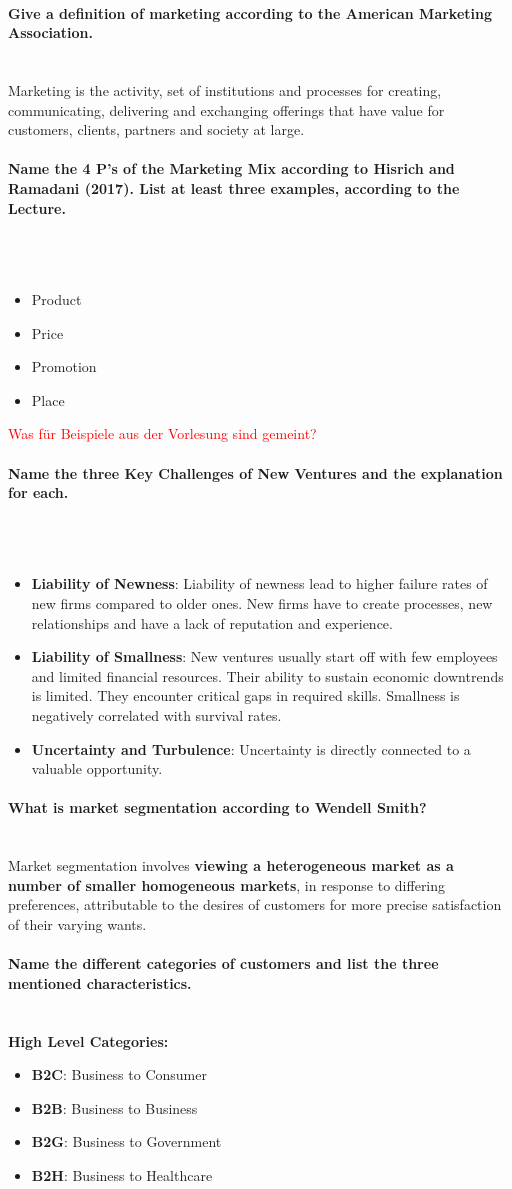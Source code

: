 \documentclass[10pt,a4paper,noendnumber=true]{scrartcl}
\newcommand{\properparagraph}[1]{\paragraph{\textcolor{Emerald}{#1}}\mbox{}\\}
\begin{document}
\properparagraph{Give a definition of marketing according to the American Marketing Association.}
Marketing is the activity, set of institutions and processes for creating, communicating, delivering and exchanging offerings that have value for customers, clients, partners and society at large.

\properparagraph{ Name the 4 P’s of the Marketing Mix according to Hisrich and Ramadani (2017). List at least three examples, according to the Lecture.}
\\[-6ex]
\begin{itemize}
	\item Product
	\item Price
	\item Promotion
	\item Place
\end{itemize}

\textcolor{red}{Was für Beispiele aus der Vorlesung sind gemeint?}

\properparagraph{Name the three Key Challenges of New Ventures and the explanation for each.}
\\[-6ex]
\begin{itemize}
	\item \textbf{Liability of Newness}: 
	Liability of newness lead to higher failure rates of new firms compared to older ones. New firms have to create processes, new relationships and have a lack of reputation and experience.
	\item \textbf{Liability of Smallness}:
	New ventures usually start off with few employees and limited financial resources. Their ability to sustain economic downtrends is limited. They encounter critical gaps in required skills. Smallness is negatively correlated with survival rates.
	\item \textbf{Uncertainty and Turbulence}:
	Uncertainty is directly connected to a valuable opportunity.
\end{itemize}

\properparagraph{What is market segmentation according to Wendell Smith?}
Market segmentation involves \textbf{viewing a heterogeneous market as a number of smaller homogeneous markets}, in response to differing preferences, attributable to the desires of customers for more precise satisfaction of their varying wants.

\properparagraph{Name the different categories of customers and list the three mentioned characteristics.}

\textbf{High Level Categories:}
\begin{itemize}
	\item \textbf{B2C}: Business to Consumer
	\item \textbf{B2B}: Business to Business
	\item \textbf{B2G}: Business to Government
	\item \textbf{B2H}: Business to Healthcare
\end{itemize}
\end{document}
